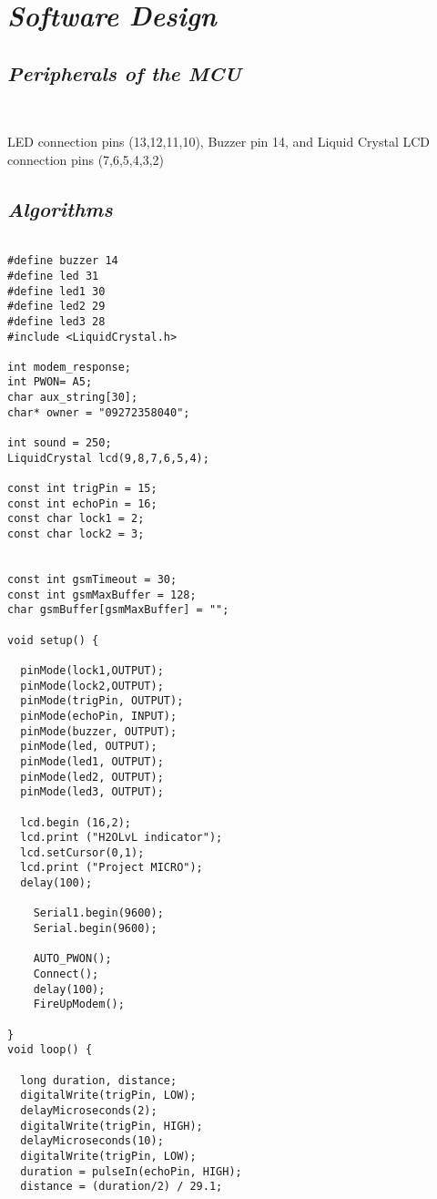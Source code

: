 \documentclass[11pt]{article}
\begin{document}
{\begin{table}[h!]
\begin{center}
\begin{tabular}{|l|l|l|l|}
    \end{tabular}
  \end{center}
\end{table}

\section{\emph{Software Design}}

\subsection{\emph{Peripherals of the MCU}}\

LED connection pins (13,12,11,10),
Buzzer pin 14, and
Liquid Crystal LCD connection pins (7,6,5,4,3,2)

\subsection{\emph{Algorithms}}

\begin{lstlisting}

#define buzzer 14
#define led 31
#define led1 30
#define led2 29
#define led3 28
#include <LiquidCrystal.h>

int modem_response;
int PWON= A5;
char aux_string[30];
char* owner = "09272358040";

int sound = 250;
LiquidCrystal lcd(9,8,7,6,5,4);

const int trigPin = 15;
const int echoPin = 16;
const char lock1 = 2;
const char lock2 = 3;


const int gsmTimeout = 30;
const int gsmMaxBuffer = 128;
char gsmBuffer[gsmMaxBuffer] = "";

void setup() {

  pinMode(lock1,OUTPUT);
  pinMode(lock2,OUTPUT);
  pinMode(trigPin, OUTPUT);
  pinMode(echoPin, INPUT);
  pinMode(buzzer, OUTPUT);
  pinMode(led, OUTPUT);
  pinMode(led1, OUTPUT);
  pinMode(led2, OUTPUT);
  pinMode(led3, OUTPUT);

  lcd.begin (16,2);
  lcd.print ("H2OLvL indicator");
  lcd.setCursor(0,1);
  lcd.print ("Project MICRO");
  delay(100);
  
    Serial1.begin(9600);
    Serial.begin(9600);    

    AUTO_PWON();
    Connect();
    delay(100);
    FireUpModem();
  
}
void loop() {

  long duration, distance;
  digitalWrite(trigPin, LOW); 
  delayMicroseconds(2);
  digitalWrite(trigPin, HIGH);
  delayMicroseconds(10);
  digitalWrite(trigPin, LOW);
  duration = pulseIn(echoPin, HIGH);
  distance = (duration/2) / 29.1;


\end{lstlisting}}
\end{document}
